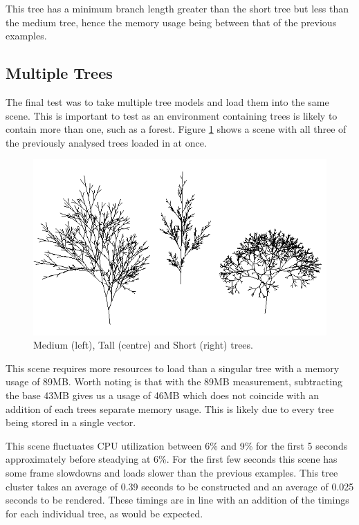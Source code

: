 \documentclass[final]{cmpreport}
\begin{document}
This tree has a minimum branch length greater than the short tree but less than the medium tree,
hence the memory usage being between that of the previous examples.

\pagebreak
\subsection{Multiple Trees}
The final test was to take multiple tree models and load them into the same scene. This is 
important to test as an environment containing trees is likely to contain more than one, such as 
a forest. Figure \ref{fig:trees-ghi} shows a scene with all three of the previously analysed 
trees loaded in at once. 

\begin{figure}[ht]
    \includegraphics[scale=0.7]{trees-ghi.PNG} 
    \centering
    \captionsetup{justification=centering}
    \caption{Medium (left), Tall (centre) and Short (right) trees.}
    \label{fig:trees-ghi}
\end{figure}

This scene requires more resources to load than a singular tree with a memory usage of 89MB. 
Worth noting is that with the 89MB measurement, subtracting the base 43MB gives us a usage of 
46MB which does not coincide with an addition of each trees separate memory usage.
This is likely due to every tree being stored in a single vector.

This scene fluctuates CPU utilization between 6\% and 9\% for the first 5 seconds 
approximately before steadying at 6\%. For the first few seconds this scene has some frame 
slowdowns and loads slower than the previous examples. This tree cluster takes 
an average of 0.39 seconds to be constructed and an average of 0.025 seconds to be rendered. 
These timings are in line with an addition of the timings for each individual tree, as would 
be expected.
\end{document}
